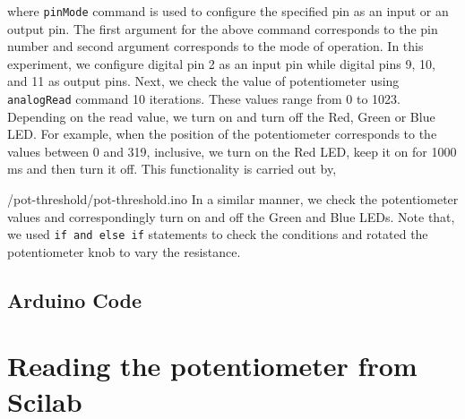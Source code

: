 where {\tt pinMode} command is used to configure the specified pin as
an input or an output pin. The first argument for the above command
corresponds to the pin number and second argument corresponds to the
mode of operation. In this experiment, we configure digital pin 2 as
an input pin while digital pins 9, 10, and 11 as output pins. Next, we
check the value of potentiometer using {\tt analogRead} command 10
iterations. These values range from 0 to 1023. Depending on the read
value, we turn on and turn off the Red, Green or Blue LED. For
example, when the position of the potentiometer corresponds to the
values between 0 and 319, inclusive, we turn on the Red LED, keep it
on for 1000 ms and then turn it off. This functionality is carried out
by,

                {\LocPotardcode/pot-threshold/pot-threshold.ino}
In a similar manner,
we check the potentiometer values and correspondingly turn on and off
the Green and Blue LEDs. Note that, we used {\tt if and else if}
statements to check the conditions and rotated the potentiometer knob
to vary the resistance.

\subsection{Arduino Code}
\lstset{style=mystyle}
\label{sec:pot-arduino-code}

\begin{ardcode}
\label{ard:pot-100}

\end{ardcode}

\section{Reading the potentiometer from Scilab}

